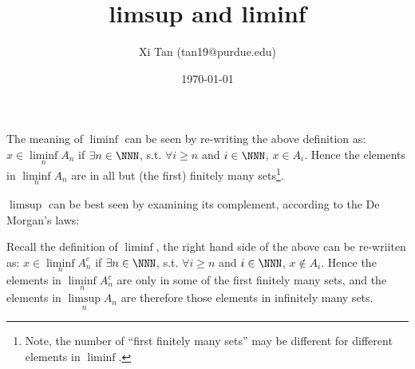\documentclass{article}
\title{limsup and liminf}
\author{Xi Tan (tan19@purdue.edu)}
\date{\today}
\begin{document}
\maketitle


The meaning of $\liminf$ can be seen by re-writing the above definition as: $x \in \liminf\limits_n A_n$ if $\exists n \in \NNN$, s.t. $\forall i \ge n$ and $i \in \NNN$, $x \in A_i$. Hence the elements in $\liminf\limits_n A_n$ are in all but (the first) finitely many sets\footnote{Note, the number of ``first finitely many sets'' may be different for different elements in $\liminf$.}.


$\limsup$ can be best seen by examining its complement, according to the De Morgan's laws:


Recall the definition of $\liminf$, the right hand side of the above can be re-wriiten as: $x \in \liminf\limits_n A_n^c$ if $\exists n \in \NNN$, s.t. $\forall i \ge n$ and $i \in \NNN$, $x \notin A_i$. Hence the elements in $\liminf\limits_n A_n^c$ are only in some of the first finitely many sets, and the elements in $\limsup\limits_n A_n$ are therefore those elements in infinitely many sets.
\end{document}

